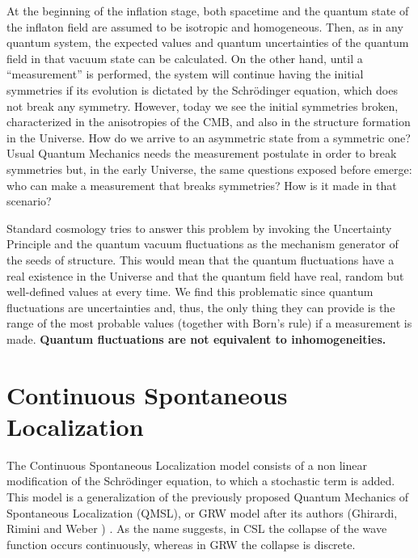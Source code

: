 \documentclass[baaa]{baaa}
\begin{document}
At the beginning of the inflation stage, both spacetime and the quantum state of the inflaton field are assumed to be isotropic and homogeneous. Then, as in any quantum system, the expected values and quantum uncertainties of the quantum field in that vacuum state can be calculated. On the other hand, until a “measurement” is performed, the system will continue having the initial symmetries if its evolution is dictated by the Schrödinger equation, which does not break any symmetry. However, today we see the initial symmetries broken, characterized in the anisotropies of the CMB, and also in the structure formation in the Universe. How do we arrive to an asymmetric state from a symmetric one? Usual Quantum Mechanics needs the measurement postulate in order to break symmetries but, in the early Universe, the same questions exposed before emerge: who can make a measurement that breaks symmetries? How is it made in that scenario?

Standard cosmology tries to answer this problem by invoking the Uncertainty Principle and the quantum vacuum fluctuations as the mechanism generator of the seeds of structure. This would mean that the quantum fluctuations have a real existence in the Universe and that the quantum field have real, random but well-defined values at every time. We find this problematic since quantum fluctuations are uncertainties and, thus, the only thing they can provide is the range of the most probable values (together with Born’s rule) if a measurement is made. \textbf{Quantum fluctuations are not equivalent to inhomogeneities.} 


\section{Continuous Spontaneous Localization}\label{sec:guia}

The Continuous Spontaneous Localization model consists of a non linear modification of the Schrödinger equation, to which a stochastic term is added. This model is a generalization of the previously proposed Quantum Mechanics of Spontaneous Localization (QMSL), or GRW model after its authors (Ghirardi, Rimini and Weber ) \citep{GhirardiRiminiWeber1986}. As the name suggests, in CSL the collapse of the wave function occurs continuously, whereas in GRW the collapse is discrete.
\end{document}
